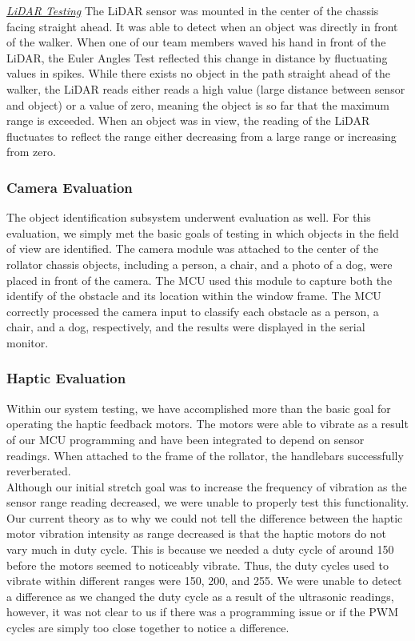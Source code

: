 \noindent \underline{\textit{LiDAR Testing}} \noindent The LiDAR sensor was mounted in the center of the chassis facing straight ahead. It was able to detect when an object was directly in front of the walker. When one of our team members waved his hand in front of the LiDAR, the Euler Angles Test reflected this change in distance by fluctuating values in spikes. While there exists no object in the path straight ahead of the walker, the LiDAR reads either reads a high value (large distance between sensor and object) or a value of zero, meaning the object is so far that the maximum range is exceeded. When an object was in view, the reading of the LiDAR fluctuates to reflect the range either decreasing from a large range or increasing from zero.

\subsubsection{Camera Evaluation}
\noindent The object identification subsystem underwent evaluation as well. For this evaluation, we simply met the basic goals of testing in which objects in the field of view are identified. The camera module was attached to the center of the rollator chassis objects, including a person, a chair, and a photo of a dog, were placed in front of the camera. The MCU used this module to capture both the identify of the obstacle and its location within the window frame. The MCU correctly processed the camera input to classify each obstacle as a person, a chair, and a dog, respectively, and the results were displayed in the serial monitor.

\subsubsection{Haptic Evaluation}
\noindent Within our system testing, we have accomplished more than the basic goal for operating the haptic feedback motors. The motors were able to vibrate as a result of our MCU programming and have been integrated to depend on sensor readings. When attached to the frame of the rollator, the handlebars successfully reverberated.\\

\noindent Although our initial stretch goal was to increase the frequency of vibration as the sensor range reading decreased, we were unable to properly test this functionality. Our current theory as to why we could not tell the difference between the haptic motor vibration intensity as range decreased is that the haptic motors do not vary much in duty cycle. This is because we needed a duty cycle of around 150 before the motors seemed to noticeably vibrate. Thus, the duty cycles used to vibrate within different ranges were 150, 200, and 255. We were unable to detect a difference as we changed the duty cycle as a result of the ultrasonic readings, however, it was not clear to us if there was a programming issue or if the PWM cycles are simply too close together to notice a difference.\\

